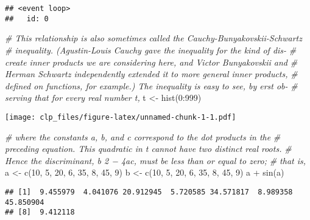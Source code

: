 \documentclass[
]{article}
\newenvironment{Shaded}{\begin{snugshade}}{\end{snugshade}}
\newcommand{\CommentTok}[1]{\textcolor[rgb]{0.56,0.35,0.01}{\textit{#1}}}
\newcommand{\DecValTok}[1]{\textcolor[rgb]{0.00,0.00,0.81}{#1}}
\newcommand{\FunctionTok}[1]{\textcolor[rgb]{0.00,0.00,0.00}{#1}}
\newcommand{\NormalTok}[1]{#1}
\newcommand{\OtherTok}[1]{\textcolor[rgb]{0.56,0.35,0.01}{#1}}
\newcommand{\SpecialCharTok}[1]{\textcolor[rgb]{0.00,0.00,0.00}{#1}}
\begin{document}
\begin{verbatim}
## <event loop>
##   id: 0
\end{verbatim}

\begin{Shaded}
\begin{Highlighting}[]
\CommentTok{\# This relationship is also sometimes called the Cauchy{-}Bunyakovskii{-}Schwartz}
\CommentTok{\# inequality. (Agustin{-}Louis Cauchy gave the inequality for the kind of dis{-}}
\CommentTok{\# create inner products we are considering here, and Victor Bunyakovskii and}
\CommentTok{\# Herman Schwartz independently extended it to more general inner products,}
\CommentTok{\# defined on functions, for example.) The inequality is easy to see, by erst ob{-}}
\CommentTok{\# serving that for every real number t,}
\NormalTok{t }\OtherTok{\textless{}{-}} \FunctionTok{hist}\NormalTok{(}\DecValTok{0}\SpecialCharTok{:}\DecValTok{999}\NormalTok{)}
\end{Highlighting}
\end{Shaded}

\texttt{[image: clp\_files/figure-latex/unnamed-chunk-1-1.pdf]}

\begin{Shaded}
\begin{Highlighting}[]
\CommentTok{\# where the constants a, b, and c correspond to the dot products in the }
\CommentTok{\# preceding equation. This quadratic in t cannot have two distinct real roots. }
\CommentTok{\# Hence the discriminant, b 2 − 4ac, must be less than or equal to zero; }
\CommentTok{\# that is,}
\NormalTok{a }\OtherTok{\textless{}{-}} \FunctionTok{c}\NormalTok{(}\DecValTok{10}\NormalTok{, }\DecValTok{5}\NormalTok{, }\DecValTok{20}\NormalTok{, }\DecValTok{6}\NormalTok{, }\DecValTok{35}\NormalTok{, }\DecValTok{8}\NormalTok{, }\DecValTok{45}\NormalTok{, }\DecValTok{9}\NormalTok{)}
\NormalTok{b }\OtherTok{\textless{}{-}} \FunctionTok{c}\NormalTok{(}\DecValTok{10}\NormalTok{, }\DecValTok{5}\NormalTok{, }\DecValTok{20}\NormalTok{, }\DecValTok{6}\NormalTok{, }\DecValTok{35}\NormalTok{, }\DecValTok{8}\NormalTok{, }\DecValTok{45}\NormalTok{, }\DecValTok{9}\NormalTok{)}
\NormalTok{a }\SpecialCharTok{+} \FunctionTok{sin}\NormalTok{(a)}
\end{Highlighting}
\end{Shaded}

\begin{verbatim}
## [1]  9.455979  4.041076 20.912945  5.720585 34.571817  8.989358 45.850904
## [8]  9.412118
\end{verbatim}
\end{document}
